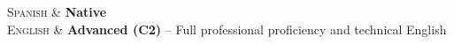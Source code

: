 
\begin{skills}
    \textsc{Spanish}      & \textbf{Native} \\
    \textsc{English}      & \textbf{Advanced (C2)} – Full professional proficiency and technical English \\
\end{skills}